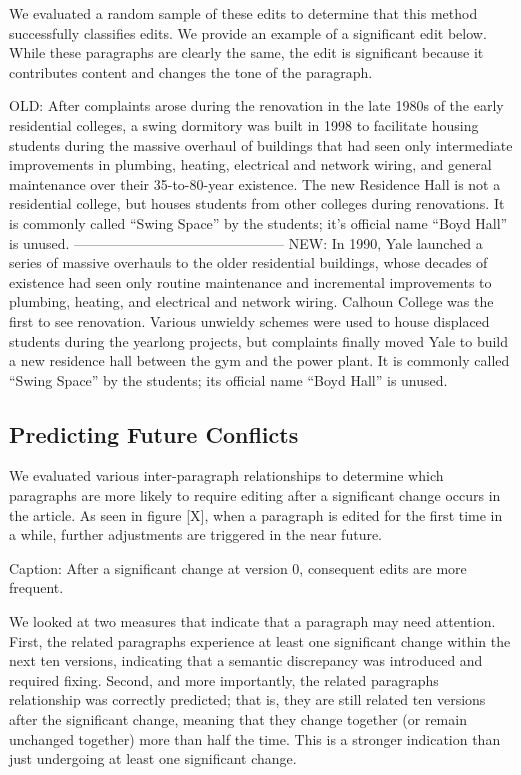 We evaluated a random sample of these edits to determine that this
method successfully classifies edits. We provide an example of a
significant edit below. While these paragraphs are clearly the same, the
edit is significant because it contributes content and changes the tone
of the paragraph.

OLD: After complaints arose during the renovation in the late 1980s of
the early residential colleges, a swing dormitory was built in 1998 to
facilitate housing students during the massive overhaul of buildings
that had seen only intermediate improvements in plumbing, heating,
electrical and network wiring, and general maintenance over their
35-to-80-year existence. The new Residence Hall is not a residential
college, but houses students from other colleges during renovations. It
is commonly called ``Swing Space'' by the students; it's official name
``Boyd Hall'' is unused. ---------------------------------------------
NEW: In 1990, Yale launched a series of massive overhauls to the older
residential buildings, whose decades of existence had seen only routine
maintenance and incremental improvements to plumbing, heating, and
electrical and network wiring. Calhoun College was the first to see
renovation. Various unwieldy schemes were used to house displaced
students during the yearlong projects, but complaints finally moved Yale
to build a new residence hall between the gym and the power plant. It is
commonly called ``Swing Space'' by the students; its official name
``Boyd Hall'' is unused.

\subsection{Predicting Future
Conflicts}\label{predicting-future-conflicts-1}

We evaluated various inter-paragraph relationships to determine which
paragraphs are more likely to require editing after a significant change
occurs in the article. As seen in figure {[}X{]}, when a paragraph is
edited for the first time in a while, further adjustments are triggered
in the near future.

Caption: After a significant change at version 0, consequent edits are
more frequent.

We looked at two measures that indicate that a paragraph may need
attention. First, the related paragraphs experience at least one
significant change within the next ten versions, indicating that a
semantic discrepancy was introduced and required fixing. Second, and
more importantly, the related paragraphs relationship was correctly
predicted; that is, they are still related ten versions after the
significant change, meaning that they change together (or remain
unchanged together) more than half the time. This is a stronger
indication than just undergoing at least one significant change.

